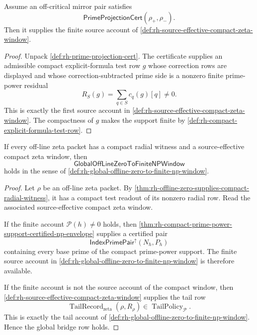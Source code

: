 \begin{theorem}
\label{thm:rh-prime-projection-cert-supplies-source-effective-window}
Assume an off-critical mirror pair satisfies
$$
\mathsf{PrimeProjectionCert}(\rho_+,\rho_-).
$$
Then it supplies the finite source account of
\autoref{def:rh-source-effective-compact-zeta-window}.
\end{theorem}

\begin{proof}
Unpack \autoref{def:rh-prime-projection-cert}.  The certificate supplies
an admissible compact explicit-formula test row $g$ whose correction
rows are displayed and whose correction-subtracted prime side is a
nonzero finite prime-power residual
$$
R_S(g)=\sum_{q\in S}c_q(g)[q]\ne0.
$$
This is exactly the first source account in
\autoref{def:rh-source-effective-compact-zeta-window}.  The compactness
of $g$ makes the support finite by
\autoref{def:rh-compact-explicit-formula-test-row}.
\end{proof}

\begin{theorem}
\label{thm:rh-source-effective-window-realizes-global-finite-np-bridge}
If every off-line zeta packet has a compact radial witness and a
source-effective compact zeta window, then
$$
\mathsf{GlobalOffLineZeroToFiniteNPWindow}
$$
holds in the sense of
\autoref{def:rh-global-offline-zero-to-finite-np-window}.
\end{theorem}

\begin{proof}
Let $\rho$ be an off-line zeta packet.  By
\autoref{thm:rh-offline-zero-supplies-compact-radial-witness}, it has
a compact test readout of its nonzero radial row.  Read the associated
source-effective compact zeta window.

If the finite account $\mathcal P(h)\ne0$ holds, then
\autoref{thm:rh-compact-prime-power-support-certified-np-envelope}
supplies a certified pair
$$
\mathsf{IndexPrimePair}^{\uparrow}(N_h,P_h)
$$
containing every base prime of the compact prime-power support.  The
finite source account in
\autoref{def:rh-global-offline-zero-to-finite-np-window} is therefore
available.

If the finite account is not the source account of the compact window,
then \autoref{def:rh-source-effective-compact-zeta-window} supplies the
tail row
$$
\operatorname{TailRecord}_{\mathrm{zeta}}(\rho,R_\rho)
\in\operatorname{TailPolicy}_{\mathcal P}.
$$
This is exactly the tail account of
\autoref{def:rh-global-offline-zero-to-finite-np-window}.  Hence the
global bridge row holds.
\end{proof}


